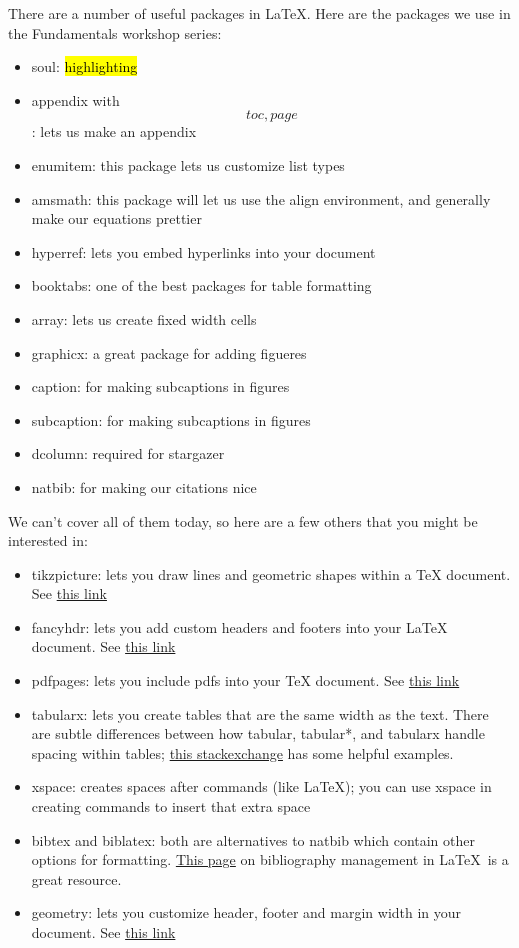 \documentclass{article}
\begin{document}
There are a number of useful packages in \LaTeX. Here are the packages we use in the Fundamentals workshop series:
\begin{itemize}
	\item soul: \hl{highlighting}
	\item appendix with \[toc, page\]: lets us make an appendix
	\item enumitem: this package lets us customize list types
	\item amsmath: this package will let us use the align environment, and generally make our equations prettier
	\item hyperref: lets you embed hyperlinks into your document
	\item booktabs: one of the best packages for table formatting
	\item array: lets us create fixed width cells
	\item graphicx: a great package for adding figueres 
	\item caption: for making subcaptions in figures
	\item subcaption: for making subcaptions in figures
	\item dcolumn: required for stargazer
	\item natbib: for making our citations nice
\end{itemize}
We can't cover all of them today, so here are a few others that you might be interested in:
\begin{itemize}
	\item tikzpicture: lets you draw lines and geometric shapes within a TeX document. See \href{http://cremeronline.com/LaTeX/minimaltikz.pdf}{this link}
	\item fancyhdr: lets you add custom headers and footers into your LaTeX document. See \href{https://www.ctan.org/pkg/fancyhdr}{this link}
	\item pdfpages: lets you include pdfs into your TeX document. See \href{https://www.ctan.org/pkg/pdfpages}{this link}
	\item tabularx: lets you create tables that are the same width as the text. There are subtle differences between how tabular, tabular*, and tabularx handle spacing within tables; \href{https://tex.stackexchange.com/questions/341205/what-is-the-difference-between-tabular-tabular-and-tabularx-environments/341212}{this stackexchange} has some helpful examples.
	\item xspace: creates spaces after commands (like \LaTeX); you can use xspace in creating commands to insert that extra space
	\item bibtex and biblatex: both are alternatives to natbib which contain other options for formatting. \href{https://www.sharelatex.com/learn/Bibliography_management_in_LaTeX}{This page} on bibliography management in \LaTeX\ is a great resource.
	\item geometry: lets you customize header, footer and margin width in your document. See \href{https://www.ctan.org/pkg/geometry}{this link}
\end{itemize}
\end{document}

